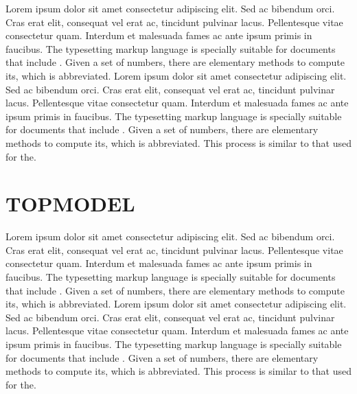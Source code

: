 \documentclass[./main.tex]{subfiles}
\begin{document}
\par Lorem ipsum dolor sit amet consectetur adipiscing elit. Sed ac bibendum orci. Cras erat elit, consequat vel erat ac, tincidunt pulvinar lacus. Pellentesque vitae consectetur quam. Interdum et malesuada fames ac ante ipsum primis in faucibus. The typesetting markup language is specially suitable for documents that include . Given a set of numbers, there are elementary methods to compute its, which is abbreviated. Lorem ipsum dolor sit amet consectetur adipiscing elit. Sed ac bibendum orci. Cras erat elit, consequat vel erat ac, tincidunt pulvinar lacus. Pellentesque vitae consectetur quam. Interdum et malesuada fames ac ante ipsum primis in faucibus. The typesetting markup language is specially suitable for documents that include . Given a set of numbers, there are elementary methods to compute its, which is abbreviated. This process is similar to that used for the. 

\section{TOPMODEL} \label{sec:hydro:topmodel}

\par Lorem ipsum dolor sit amet consectetur adipiscing elit. Sed ac bibendum orci. Cras erat elit, consequat vel erat ac, tincidunt pulvinar lacus. Pellentesque vitae consectetur quam. Interdum et malesuada fames ac ante ipsum primis in faucibus. The typesetting markup language is specially suitable for documents that include . Given a set of numbers, there are elementary methods to compute its, which is abbreviated. Lorem ipsum dolor sit amet consectetur adipiscing elit. Sed ac bibendum orci. Cras erat elit, consequat vel erat ac, tincidunt pulvinar lacus. Pellentesque vitae consectetur quam. Interdum et malesuada fames ac ante ipsum primis in faucibus. The typesetting markup language is specially suitable for documents that include . Given a set of numbers, there are elementary methods to compute its, which is abbreviated. This process is similar to that used for the. 
\end{document}
